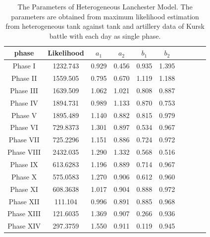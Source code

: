 \documentclass[]{article}
\begin{document}
\begin{table}
\centering
\tiny
\caption{The Parameters of Heterogeneous Lanchester Model. The parameters are obtained from maximum likelihood estimation from heterogeneous tank against tank and artillery data of Kursk battle with each day as single phase.}
{\begin{tabular}{|c|c|c|c|c|c|c|c|c|c|}   \hline\hline
phase & Likelihood  &	\bf${a_1}$ &	\bf${a_2}$ &	\bf${b_1}$&	\bf${b_2}$	 \\
\hline
\hline
Phase I &1232.743& 0.929& 0.456& 0.935& 1.395\\
\hline
Phase II &1559.505 &0.795 &0.670 &1.119 &1.188 \\
\hline
Phase III& 1639.509& 1.062 &1.021& 0.808 &0.887\\
\hline
Phase IV &1894.731& 0.989 &1.133 &0.870 &0.753 \\
\hline
Phase V &1895.489 &1.140 &0.882& 0.815 &0.979 \\
\hline
Phase VI &729.8373 &1.301 &0.897 &0.534 &0.967 \\
\hline
Phase VII &725.2296 &1.151 &0.886 &0.724& 0.972 \\
\hline
Phase VIII& 2432.035 &1.290 &1.332 &0.568& 0.516\\
\hline
Phase IX &613.6283 &1.196& 0.889 &0.714 &0.967 \\
\hline
Phase X &575.0583 &1.270& 0.906 &0.612 &0.960 \\
\hline
Phase XI &608.3638 &1.017& 0.904& 0.888& 0.972\\
\hline
Phase XII &111.104 &0.996 &0.891 &0.885 &0.968\\
\hline
Phase XIII &121.6035 &1.369 &0.907& 0.266 &0.936\\
\hline
Phase XIV &297.3759 &1.550 &0.911 &0.119 &0.945 \\
\hline
\hline
\end{tabular}}
\end{table}
\end{document}
